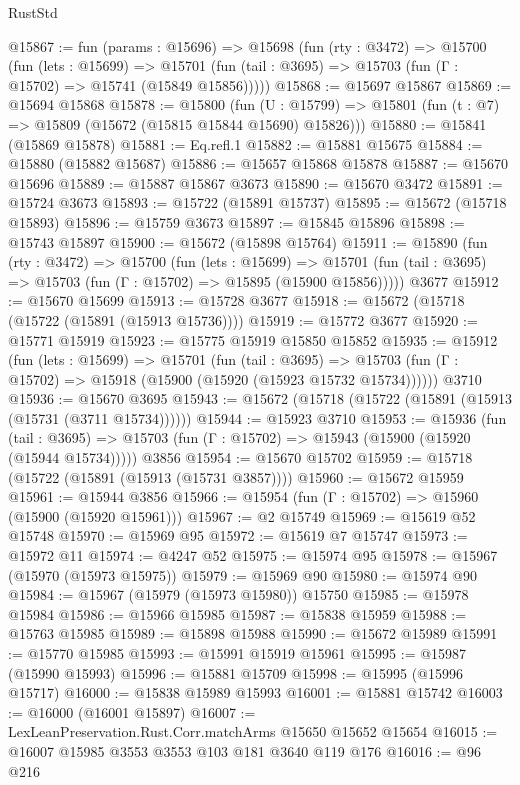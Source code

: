 \begin{lexlean}{RustStd}
\begin{coremodule}
@15867 := fun (params : @15696) =>
  @15698
    (fun (rty : @3472) =>
    @15700
      (fun (lets : @15699) =>
      @15701 (fun (tail : @3695) => @15703 (fun (Γ : @15702) => @15741 (@15849 @15856)))))
@15868 := @15697 @15867
@15869 := @15694 @15868
@15878 := @15800
    (fun (U : @15799) => @15801 (fun (t : @7) => @15809 (@15672 (@15815 @15844 @15690) @15826)))
@15880 := @15841 (@15869 @15878)
@15881 := Eq.refl.{1}
@15882 := @15881 @15675
@15884 := @15880 (@15882 @15687)
@15886 := @15657 @15868 @15878
@15887 := @15670 @15696
@15889 := @15887 @15867 @3673
@15890 := @15670 @3472
@15891 := @15724 @3673
@15893 := @15722 (@15891 @15737)
@15895 := @15672 (@15718 @15893)
@15896 := @15759 @3673
@15897 := @15845 @15896
@15898 := @15743 @15897
@15900 := @15672 (@15898 @15764)
@15911 := @15890
    (fun (rty : @3472) =>
    @15700
      (fun (lets : @15699) =>
      @15701 (fun (tail : @3695) => @15703 (fun (Γ : @15702) => @15895 (@15900 @15856)))))
    @3677
@15912 := @15670 @15699
@15913 := @15728 @3677
@15918 := @15672 (@15718 (@15722 (@15891 (@15913 @15736))))
@15919 := @15772 @3677
@15920 := @15771 @15919
@15923 := @15775 @15919 @15850 @15852
@15935 := @15912
    (fun (lets : @15699) =>
    @15701
      (fun (tail : @3695) =>
      @15703 (fun (Γ : @15702) => @15918 (@15900 (@15920 (@15923 @15732 @15734))))))
    @3710
@15936 := @15670 @3695
@15943 := @15672 (@15718 (@15722 (@15891 (@15913 (@15731 (@3711 @15734))))))
@15944 := @15923 @3710
@15953 := @15936
    (fun (tail : @3695) => @15703 (fun (Γ : @15702) => @15943 (@15900 (@15920 (@15944 @15734)))))
    @3856
@15954 := @15670 @15702
@15959 := @15718 (@15722 (@15891 (@15913 (@15731 @3857))))
@15960 := @15672 @15959
@15961 := @15944 @3856
@15966 := @15954 (fun (Γ : @15702) => @15960 (@15900 (@15920 @15961)))
@15967 := @2 @15749
@15969 := @15619 @52 @15748
@15970 := @15969 @95
@15972 := @15619 @7 @15747
@15973 := @15972 @11
@15974 := @4247 @52
@15975 := @15974 @95
@15978 := @15967 (@15970 (@15973 @15975))
@15979 := @15969 @90
@15980 := @15974 @90
@15984 := @15967 (@15979 (@15973 @15980)) @15750
@15985 := @15978 @15984
@15986 := @15966 @15985
@15987 := @15838 @15959
@15988 := @15763 @15985
@15989 := @15898 @15988
@15990 := @15672 @15989
@15991 := @15770 @15985
@15993 := @15991 @15919 @15961
@15995 := @15987 (@15990 @15993)
@15996 := @15881 @15709
@15998 := @15995 (@15996 @15717)
@16000 := @15838 @15989 @15993
@16001 := @15881 @15742
@16003 := @16000 (@16001 @15897)
@16007 := LexLeanPreservation.Rust.Corr.matchArms @15650 @15652 @15654
@16015 := @16007 @15985 @3553 @3553 @103 @181 @3640 @119 @176
@16016 := @96 @216

\end{coremodule}
\end{lexlean}
